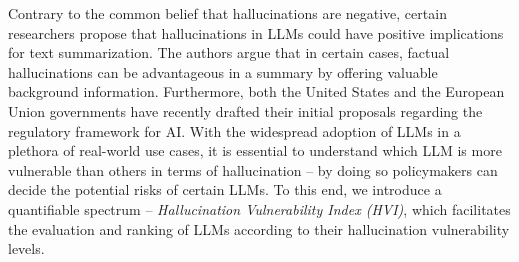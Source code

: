 
Contrary to the common belief that hallucinations are negative, certain researchers \cite{cao2022hallucinated} propose that hallucinations in LLMs could have positive implications for text summarization. The authors argue that in certain cases, factual hallucinations can be advantageous in a summary by offering valuable background information. 
Furthermore, both the United States \cite{whitehouseaibill} and the European Union \cite{euaiproposal} governments have recently drafted their initial proposals regarding the regulatory framework for AI. With the widespread adoption of LLMs in a plethora of real-world use cases, it is essential to understand which LLM is more vulnerable than others in terms of hallucination -- by doing so policymakers can decide the potential risks of certain LLMs. To this end, we introduce a quantifiable spectrum -- \emph{Hallucination Vulnerability Index (HVI)}, which facilitates the evaluation and ranking of LLMs according to their hallucination vulnerability levels.

